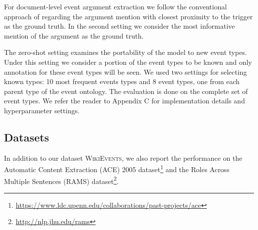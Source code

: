 For document-level event argument extraction we follow the conventional approach of regarding the argument mention with closest proximity to the trigger as the ground truth. In the second setting we consider the most informative mention of the argument as the ground truth.

The zero-shot setting examines the portability of the model to new event types. Under this setting we consider a portion of the event types to be known and only annotation for these event types will be seen. We used two settings for selecting known types: 10 most frequent events types and 8 event types, one from each parent type of the event ontology. The evaluation is done on the complete set of event types.
We refer the reader to Appendix C for implementation details and hyperparameter settings.

\subsection{Datasets}
In addition to our dataset \textsc{WikiEvents}, we also report the performance on the Automatic Content Extraction (\textsc{ACE}) 2005 dataset\footnote{\url{https://www.ldc.upenn.edu/collaborations/past-projects/ace}} and the Roles Across Multiple Sentences (\textsc{RAMS}) dataset\footnote{\url{http://nlp.jhu.edu/rams}}. 

